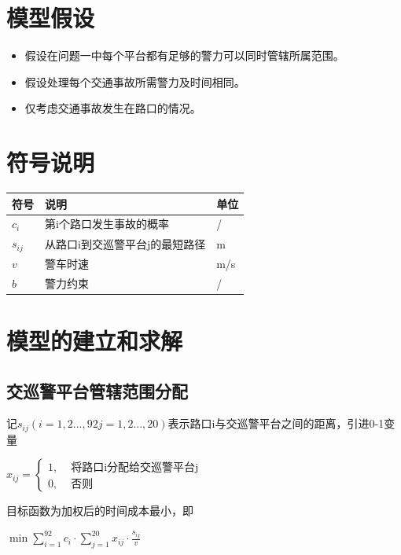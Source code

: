 \documentclass[withoutpreface,bwprint]{cumcmthesis} %
\begin{document}
	
	
	\section{模型假设}
	
	\begin{itemize}
		\item 假设在问题一中每个平台都有足够的警力可以同时管辖所属范围。
		\item 假设处理每个交通事故所需警力及时间相同。
		\item 仅考虑交通事故发生在路口的情况。
	\end{itemize}
	
	\section{符号说明}
	
	\begin{table}[H]
		\centering
		\begin{tabular}{p{2cm}<{\centering}p{9cm}<{\centering}p{2cm}<{\centering}}
			\toprule[1.5pt]
			符号 & 说明 & 单位 \\
			\midrule
			$c_i$ & 第i个路口发生事故的概率  & / \\
			$s_{i j}$ & 从路口i到交巡警平台j的最短路径 & m \\
			$v$ & 警车时速 & m/s \\
			$b$ & 警力约束 & / \\
			\bottomrule[1.5pt]
		\end{tabular}
	\end{table}
	
	\section{模型的建立和求解}
	\subsection{交巡警平台管辖范围分配}
	
	记$s_{i j}(i=1,2...,92 j=1,2...,20)$表示路口i与交巡警平台之间的距离，引进0-1变量
	\begin{center}
		$x_{i j}= \left\{ \begin{array}{ll}
			1, & \text { 将路口i分配给交巡警平台j } \\
			0, & \text { 否则 }
		\end{array}\right.$
	\end{center}
	
	目标函数为加权后的时间成本最小，即
	\begin{center}
		$\min \sum_{i=1}^{92} c_i \cdot \sum_{j=1}^{20} x_{i j} \cdot \frac{s_{i j}}{v}$
	\end{center}
	
\end{document}
